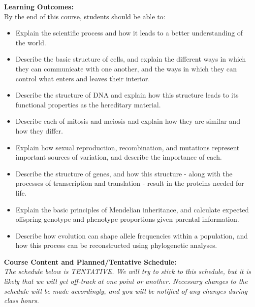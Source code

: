 \documentclass[hidelinks]{article}
\begin{document}
	\textbf{Learning Outcomes:}\\
	By the end of this course, students should be able to:
		\begin{itemize}[topsep=-8pt]
			\item Explain the scientific process and how it leads to a better understanding of the world.
			\item Describe the basic structure of cells, and explain the different ways in which they can communicate with one another, and the ways in which they can control what enters and leaves their interior.
			\item Describe the structure of DNA and explain how this structure leads to its functional properties as the hereditary material.
			\item Describe each of mitosis and meiosis and explain how they are similar and how they differ.
			\item Explain how sexual reproduction, recombination, and mutations represent important sources of variation, and describe the importance of each.
			\item Describe the structure of genes, and how this structure - along with the processes of transcription and translation -  result in the proteins needed for life.
			\item Explain the basic principles of Mendelian inheritance, and calculate expected offspring genotype and phenotype proportions given parental information.
			\item Describe how evolution can shape allele frequencies within a population, and how this process can be reconstructed using phylogenetic analyses.\\
		\end{itemize}
		

\newpage		
\textbf{Course Content and Planned/Tentative Schedule:}\\
\emph{The schedule below is TENTATIVE. We will try to stick to this schedule, but it is likely that we will get off-track at one point or another. Necessary changes to the schedule will be made accordingly, and you will be notified of any changes during class hours.}	
\end{document}
